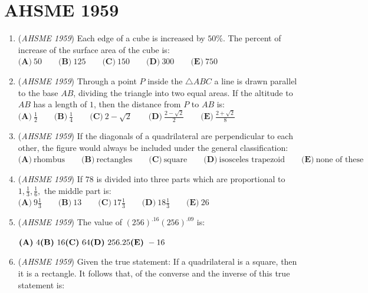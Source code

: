 \section{AHSME 1959}
        \begin{enumerate}
        	\item (\textit{AHSME 1959}) Each edge of a cube is increased by $50$\%. The percent of increase of the surface area of the cube is:
$\textbf{(A)}\ 50 \qquad\textbf{(B)}\ 125\qquad\textbf{(C)}\ 150\qquad\textbf{(D)}\ 300\qquad\textbf{(E)}\ 750$


	\item (\textit{AHSME 1959}) Through a point $P$ inside the $\triangle ABC$ a line is drawn parallel to the base $AB$, dividing the triangle into two equal areas. 
If the altitude to $AB$ has a length of $1$, then the distance from $P$ to $AB$ is:
$\textbf{(A)}\ \frac12 \qquad\textbf{(B)}\ \frac14\qquad\textbf{(C)}\ 2-\sqrt2\qquad\textbf{(D)}\ \frac{2-\sqrt2}{2}\qquad\textbf{(E)}\ \frac{2+\sqrt2}{8}$


	\item (\textit{AHSME 1959}) If the diagonals of a quadrilateral are perpendicular to each other, the figure would always be included under the general classification:
$\textbf{(A)}\ \text{rhombus} \qquad\textbf{(B)}\ \text{rectangles} \qquad\textbf{(C)}\ \text{square} \qquad\textbf{(D)}\ \text{isosceles trapezoid}\qquad\textbf{(E)}\ \text{none of these}$


	\item (\textit{AHSME 1959}) If $78$ is divided into three parts which are proportional to $1, \frac13, \frac16,$ the middle part is:
$\textbf{(A)}\ 9\frac13 \qquad\textbf{(B)}\ 13\qquad\textbf{(C)}\ 17\frac13 \qquad\textbf{(D)}\ 18\frac13\qquad\textbf{(E)}\ 26$


	\item (\textit{AHSME 1959}) The value of $\left(256\right)^{.16}\left(256\right)^{.09}$ is:


 $\textbf{(A)}\ 4 \qquad \\ \textbf{(B)}\ 16\qquad \\ \textbf{(C)}\ 64\qquad \\ \textbf{(D)}\ 256.25\qquad \\ \textbf{(E)}\ -16$


	\item (\textit{AHSME 1959}) Given the true statement: If a quadrilateral is a square, then it is a rectangle. 
It follows that, of the converse and the inverse of this true statement is:



\end{enumerate}
